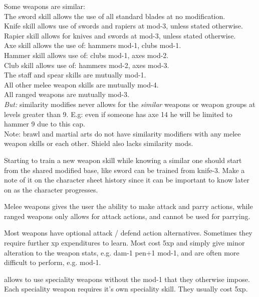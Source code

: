 Some weapons are similar:\\
The sword skill allows the use of all standard blades at no modification.\\
Knife skill allows use of swords and rapiers at mod-3, unless stated otherwise.\\
Rapier skill allows for knives and swords at mod-3, unless stated otherwise.\\
Axe skill allows the use of: hammers mod-1, clubs mod-1.\\
Hammer skill allows use of: clubs mod-1, axes mod-2.\\
Club skill allows use of: hammers mod-2, axes mod-3.\\
The staff and spear skills are mutually mod-1.\\
All other melee weapon skills are mutually mod-4.\\
All ranged weapons are mutually mod-3.\\
\emph{But:} similarity modifies never allows for the \emph{similar} weapons or weapon groups at levels greater than 9. E.g: even if someone has axe 14 he will be limited to hammer 9 due to this cap.\\
Note: brawl and martial arts do not have similarity modifiers with any melee weapon skills or each other. Shield also lacks similarity mods.


Starting to train a new weapon skill while knowing a similar one should start from the shared modified base, like sword can be trained from knife-3. Make a note of it on the character sheet history since it can be important to know later on as the character progresses.

Melee weapons gives the user the ability to make attack and parry actions, while ranged weapons only allows for attack actions, and cannot be used for parrying.

Most weapons have optional attack / defend action alternatives. Sometimes they require further xp expenditures to learn. Most cost 5xp and simply give minor alteration to the weapon stats, e.g. dam-1 pen+1 mod-1, and are often more difficult to perform, e.g. mod-1.


 allows to use speciality weapons without the mod-1 that they otherwise impose. Each speciality weapon requires it's own speciality skill. They usually cost 5xp.


